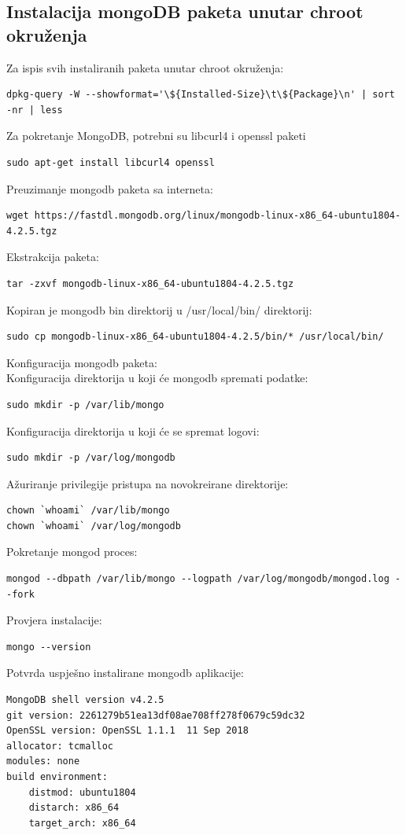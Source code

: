 \documentclass[12pt,vi]{mitthesis}
\begin{document}
\subsection*{Instalacija mongoDB paketa unutar chroot okruženja}
\noindent
Za ispis svih instaliranih paketa unutar chroot okruženja:
\begin{lstlisting}[style=BashInputStyle]
dpkg-query -W --showformat='\${Installed-Size}\t\${Package}\n' | sort -nr | less
\end{lstlisting}
\noindent
Za pokretanje MongoDB, potrebni su libcurl4 i openssl paketi\cite{mongodb-howto}
\begin{lstlisting}[style=BashInputStyle]
sudo apt-get install libcurl4 openssl
\end{lstlisting}
Preuzimanje mongodb paketa sa interneta:
\begin{lstlisting}[style=BashInputStyle]
wget https://fastdl.mongodb.org/linux/mongodb-linux-x86_64-ubuntu1804-4.2.5.tgz
\end{lstlisting}
Ekstrakcija paketa:
\begin{lstlisting}[style=BashInputStyle]
tar -zxvf mongodb-linux-x86_64-ubuntu1804-4.2.5.tgz
\end{lstlisting}
Kopiran je mongodb bin direktorij u /usr/local/bin/ direktorij:
\begin{lstlisting}[style=BashInputStyle]
sudo cp mongodb-linux-x86_64-ubuntu1804-4.2.5/bin/* /usr/local/bin/
\end{lstlisting}
Konfiguracija mongodb paketa:\\
Konfiguracija direktorija u koji će mongodb spremati podatke:
\begin{lstlisting}[style=BashInputStyle]
sudo mkdir -p /var/lib/mongo
\end{lstlisting}
Konfiguracija direktorija u koji će se spremat logovi:
\begin{lstlisting}[style=BashInputStyle]
sudo mkdir -p /var/log/mongodb
\end{lstlisting}
Ažuriranje privilegije pristupa na novokreirane direktorije:
\begin{lstlisting}[style=BashInputStyle]
chown `whoami` /var/lib/mongo 
chown `whoami` /var/log/mongodb
\end{lstlisting}
Pokretanje mongod proces:
\begin{lstlisting}[style=BashInputStyle]
mongod --dbpath /var/lib/mongo --logpath /var/log/mongodb/mongod.log --fork
\end{lstlisting}
Provjera instalacije:
\begin{lstlisting}[style=BashInputStyle]
mongo --version
\end{lstlisting}
Potvrda uspješno instalirane mongodb aplikacije:
\begin{lstlisting}[style=BashInputStyle]
MongoDB shell version v4.2.5
git version: 2261279b51ea13df08ae708ff278f0679c59dc32
OpenSSL version: OpenSSL 1.1.1  11 Sep 2018
allocator: tcmalloc
modules: none
build environment:
    distmod: ubuntu1804
    distarch: x86_64
    target_arch: x86_64
\end{lstlisting}
\end{document}
